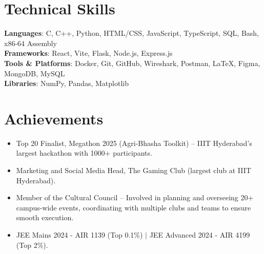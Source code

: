 \documentclass[letterpaper,11pt]{article}
\makeatletter
\newcommand{\resumeItem}[1]{
  \item \small #1\vspace{-2pt}
}
\newcommand{\resumeProjectHeading}[2]{
    \item
    \begin{tabular*}{0.97\textwidth}{l@{\extracolsep{\fill}}r}
      \small#1 & #2 \\
    \end{tabular*}\vspace{-3pt}
}
\newcommand{\resumeSubHeadingListStart}{\begin{itemize}[leftmargin=0in, label={}]}
\newcommand{\resumeSubHeadingListEnd}{\end{itemize}}
\newcommand{\resumeItemListStart}{\begin{itemize}[leftmargin=0.35in, label=\textbullet, itemsep=2pt, topsep=0pt, parsep=0pt]}
\newcommand{\resumeItemListEnd}{\end{itemize}\vspace{-3pt}}
\newcommand{\resumeItemListStartNoIndent}{\begin{itemize}[leftmargin=0.15in, label=\textbullet, itemsep=2pt, topsep=0pt, parsep=0pt]}
\newcommand{\resumeItemListEndNoIndent}{\end{itemize}\vspace{-3pt}}
\makeatother
\begin{document}
\section{Technical Skills}
 \begin{itemize}[leftmargin=0in, label={}]
    \small{\item{
     \textbf{Languages}{: C, C++, Python, HTML/CSS, JavaScript, TypeScript, SQL, Bash, x86-64 Assembly} \\
     \textbf{Frameworks}{: React, Vite, Flask, Node.js, Express.js} \\
     \textbf{Tools \& Platforms}{: Docker, Git, GitHub, Wireshark, Postman, LaTeX, Figma, MongoDB, MySQL} \\
     \textbf{Libraries}{: NumPy, Pandas, Matplotlib} \\
    }}
 \end{itemize}


\section{Achievements}
  \resumeItemListStartNoIndent
    \resumeItem{\small Top 20 Finalist, Megathon 2025 (Agri-Bhasha Toolkit) -- IIIT Hyderabad's largest hackathon with 1000+ participants.}
    \resumeItem{\small Marketing and Social Media Head, The Gaming Club (largest club at IIIT Hyderabad).}
    \resumeItem{\small Member of the Cultural Council -- Involved in planning and overseeing 20+ campus-wide events, coordinating with multiple clubs and teams to ensure smooth execution.}
    \resumeItem{\small JEE Mains 2024 - AIR 1139 (Top 0.1\%) $|$ JEE Advanced 2024 - AIR 4199 (Top 2\%).}
  \resumeItemListEndNoIndent


\end{document}
